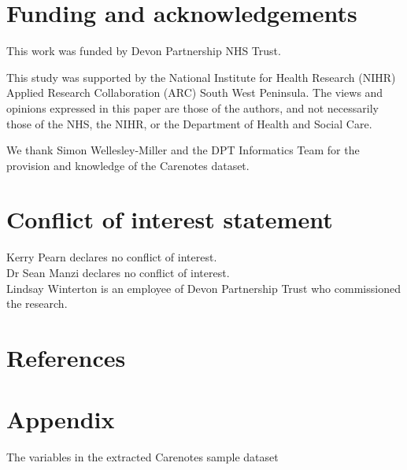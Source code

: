 \documentclass{article}
\begin{document}
\section*{Funding and acknowledgements}

This work was funded by Devon Partnership NHS Trust.

This study was supported by the National Institute for Health Research (NIHR) Applied Research Collaboration (ARC) South West Peninsula. The views and opinions expressed in this paper are those of the authors, and not necessarily those of the NHS, the NIHR, or the Department of Health and Social Care.

We thank Simon Wellesley-Miller and the DPT Informatics Team for the provision and knowledge of the Carenotes dataset.

\section{Conflict of interest statement}

Kerry Pearn declares no conflict of interest.\\
Dr Sean Manzi declares no conflict of interest.\\
Lindsay Winterton is an employee of Devon Partnership Trust who commissioned the research.

\section{References}




\newpage
\section{Appendix}
The variables in the extracted Carenotes sample dataset
\end{document}
